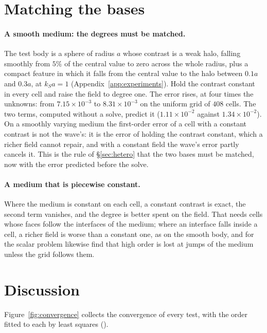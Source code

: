\documentclass[11pt,a4paper]{article}
\begin{document}
\section{Matching the bases}\label{sec:which}

\paragraph{A smooth medium: the degrees must be matched.} The test body is a sphere of radius $a$ whose
contrast is a weak halo, falling smoothly from $5\%$ of the central value to zero across the whole radius,
plus a compact feature in which it falls from the central value to the halo between $0.1a$ and $0.3a$, at
$k_Sa=1$ (Appendix~\ref{app:experiments}). Hold the contrast constant in every cell and raise the field to
degree one. The error rises, at four times the unknowns: from $7.15\times10^{-3}$ to $8.31\times10^{-3}$ on
the uniform grid of $408$ cells. The two terms, computed without a solve, predict it
($1.11\times10^{-2}$ against $1.34\times10^{-2}$). On a smoothly varying medium the first-order error of a
cell with a constant contrast is not the wave's: it is the error of holding the contrast constant, which a
richer field cannot repair, and with a constant field the wave's error partly cancels it. This is the rule
of \S\ref{sec:hetero} that the two bases must be matched, now with the error predicted before the
solve.

\paragraph{A medium that is piecewise constant.} Where the medium is constant on each cell, a constant
contrast is exact, the second term vanishes, and the degree is better spent on the field. That needs cells
whose faces follow the interfaces of the medium; where an interface falls inside a cell, a richer field is
worse than a constant one, as on the smooth body, and for the scalar problem \citet{Anderson2026} likewise
find that high order is lost at jumps of the medium unless the grid follows them.


\section{Discussion}\label{sec:discussion}

Figure~\ref{fig:convergence} collects the convergence of every test, with the order fitted to each by
least squares ().
\end{document}
